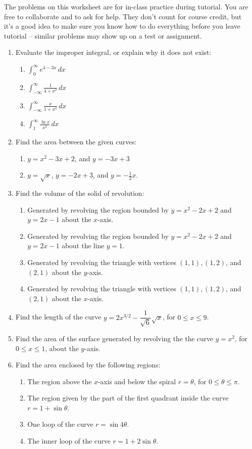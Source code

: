 \documentclass[12pt]{article}
\newcommand{\di}{\displaystyle}
\begin{document}
\thispagestyle{fancy}
The problems on this worksheet are for in-class practice during tutorial. You are free to collaborate and to ask for help. They don't count for course credit, but it's a good idea to make sure you know how to do everything before you leave tutorial -- similar problems may show up on a test or assignment.

\begin{enumerate}
 \item Evaluate the improper integral, or explain why it does not exist:
\begin{enumerate}
 \item $\di \int_0^\infty e^{4-3x}\,dx$
 \item $\di \int_{-\infty}^\infty \frac{1}{4+x^2}\,dx$
 \item $\di \int_{-\infty}^\infty \frac{x}{1+x^2}\,dx$
 \item $\di \int_1^\infty\frac{\ln x}{x^2}\,dx$
\end{enumerate}
 \item Find the area between the given curves:
\begin{enumerate}
 \item $y=x^2-3x+2$, and $y=-3x+3$
 \item $y=\sqrt{x}$, $y=-2x+3$, and $y=-\frac{1}{2}x$.
\end{enumerate}
\item Find the volume of the solid of revolution:
\begin{enumerate}
 \item Generated by revolving the region bounded by $y=x^2-2x+2$ and $y=2x-1$ about the $x$-axis.
 \item Generated by revolving the region bounded by $y=x^2-2x+2$ and $y=2x-1$ about the line $y=1$.
 \item Generated by revolving the triangle with vertices $(1,1), (1,2)$, and $(2,1)$ about the $y$-axis.
 \item Generated by revolving the triangle with vertices $(1,1), (1,2)$, and $(2,1)$ about the $x$-axis.
\end{enumerate}
\item Find the length of the curve $y=2x^{3/2}-\dfrac{1}{\sqrt{6}}\sqrt{x}$, for $0\leq x\leq 9$.
\item Find the area of the surface generated by revolving the the curve $y=x^2$, for $0\leq x\leq 1$, about the $y$-axis.
\item Find the area enclosed by the following regions:
\begin{enumerate}
 \item The region above the $x$-axis and below the spiral $r=\theta$, for $0\leq \theta \leq \pi$.
 \item The region given by the part of the first quadrant inside the curve $r=1+\sin\theta$.
 \item One loop of the curve $r=\sin 4\theta$.
 \item The inner loop of the curve $r=1+2\sin\theta$.
\end{enumerate}
\pagebreak


\end{enumerate}
\end{document}
